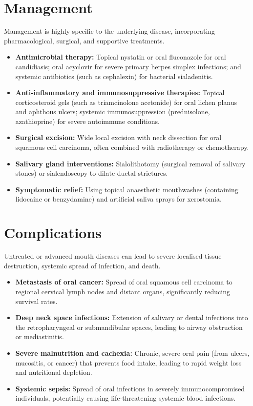 \section*{Management}
Management is highly specific to the underlying disease, incorporating pharmacological, surgical, and supportive treatments.
\begin{itemize}
    \item \textbf{Antimicrobial therapy:} Topical nystatin or oral fluconazole for oral candidiasis; oral acyclovir for severe primary herpes simplex infections; and systemic antibiotics (such as cephalexin) for bacterial sialadenitis.
    \item \textbf{Anti-inflammatory and immunosuppressive therapies:} Topical corticosteroid gels (such as triamcinolone acetonide) for oral lichen planus and aphthous ulcers; systemic immunosuppression (prednisolone, azathioprine) for severe autoimmune conditions.
    \item \textbf{Surgical excision:} Wide local excision with neck dissection for oral squamous cell carcinoma, often combined with radiotherapy or chemotherapy.
    \item \textbf{Salivary gland interventions:} Sialolithotomy (surgical removal of salivary stones) or sialendoscopy to dilate ductal strictures.
    \item \textbf{Symptomatic relief:} Using topical anaesthetic mouthwashes (containing lidocaine or benzydamine) and artificial saliva sprays for xerostomia.
\end{itemize}

\section*{Complications}
Untreated or advanced mouth diseases can lead to severe localised tissue destruction, systemic spread of infection, and death.
\begin{itemize}
    \item \textbf{Metastasis of oral cancer:} Spread of oral squamous cell carcinoma to regional cervical lymph nodes and distant organs, significantly reducing survival rates.
    \item \textbf{Deep neck space infections:} Extension of salivary or dental infections into the retropharyngeal or submandibular spaces, leading to airway obstruction or mediastinitis.
    \item \textbf{Severe malnutrition and cachexia:} Chronic, severe oral pain (from ulcers, mucositis, or cancer) that prevents food intake, leading to rapid weight loss and nutritional depletion.
    \item \textbf{Systemic sepsis:} Spread of oral infections in severely immunocompromised individuals, potentially causing life-threatening systemic blood infections.
\end{itemize}

